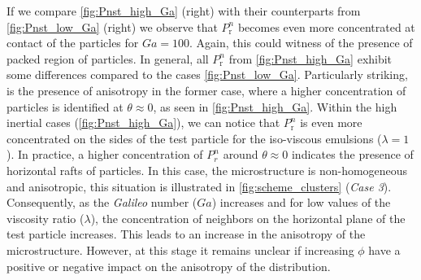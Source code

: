 If we compare \ref{fig:Pnst_high_Ga} (right) with their counterparts from \ref{fig:Pnst_low_Ga} (right) we observe that $P^n_\text{r}$ becomes even more concentrated at contact of the particles for $Ga=100$.
Again, this could witness of the presence of packed region of particles. 
In general, all $P_\text{r}^n$ from \ref{fig:Pnst_high_Ga} exhibit some differences compared to the cases \ref{fig:Pnst_low_Ga}. 
Particularly striking, is the presence of anisotropy in the former case, where a higher concentration of particles is identified at $\theta \approx 0$, as seen in \ref{fig:Pnst_high_Ga}.
Within the high inertial cases (\ref{fig:Pnst_high_Ga}), we can notice that $P_\text{r}^n$ is even more concentrated on the sides of the test particle for the iso-viscous emulsions ($\lambda = 1$). 
In practice, a higher concentration of $P_r^n$ around $\theta \approx 0$ indicates the presence of horizontal rafts of particles. 
In this case, the microstructure is non-homogeneous and anisotropic, this situation is illustrated in \ref{fig:scheme_clusters} (\textit{Case 3}).  
Consequently, as the \textit{Galileo} number ($Ga$) increases and for low values of the viscosity ratio ($\lambda$), the concentration of neighbors on the horizontal plane of the test particle increases. 
This leads to an increase in the anisotropy of the microstructure.
However, at this stage it remains unclear if increasing $\phi$ have a positive or negative impact on the anisotropy of the distribution. 

